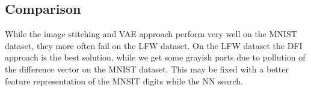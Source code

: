 \documentclass[
     11pt,         %
     a4paper,      %
     oneside,
     ]{article}
\begin{document}
\subsection{Comparison}
While the image stitching and VAE approach perform very well on the MNIST dataset, they more often fail on the LFW dataset. On the LFW dataset the DFI approach is the best solution, while we get some grayish parts due to pollution of the difference vector on the MNIST dataset. This may be fixed with a better feature representation of the MNSIT digits while the NN search.
\cite{dummyEntry}


\newpage
{}


\end{document}
